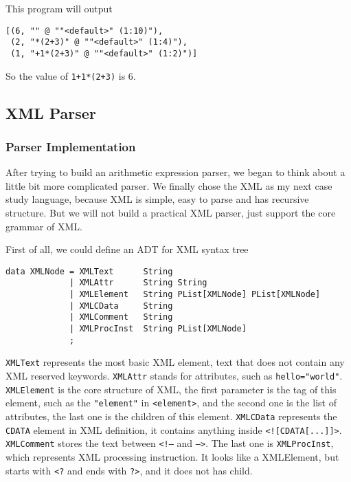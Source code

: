 This program will output

\begin{lstlisting}
[(6, "" @ ""<default>" (1:10)"),
 (2, "*(2+3)" @ ""<default>" (1:4)"),
 (1, "+1*(2+3)" @ ""<default>" (1:2)")]
\end{lstlisting}

So the value of \texttt{1+1*(2+3)} is 6.

\subsection{XML Parser}

\subsubsection{Parser Implementation}

After trying to build an arithmetic expression parser, we began to think about a little bit more complicated parser. We finally chose the XML as my next case study language, because XML is simple, easy to parse and has recursive structure. But we will not build a practical XML parser, just support the core grammar of XML.

First of all, we could define an ADT for XML syntax tree

\begin{lstlisting}
data XMLNode = XMLText      String
             | XMLAttr      String String
             | XMLElement   String PList[XMLNode] PList[XMLNode]
             | XMLCData     String
             | XMLComment   String
             | XMLProcInst  String PList[XMLNode]
             ;
\end{lstlisting}

\texttt{XMLText} represents the most basic XML element, text that does not contain any XML reserved keywords. \texttt{XMLAttr} stands for attributes, such as \texttt{hello="world"}. \texttt{XMLElement} is the core structure of XML, the first parameter is the tag of this element, such as the \texttt{"element"} in \texttt{<element>}, and the second one is the list of attributes, the last one is the children of this element. \texttt{XMLCData} represents the \texttt{CDATA} element in XML definition, it contains anything inside \texttt{<![CDATA[...]]>}. \texttt{XMLComment} stores the text between \texttt{<!--} and \texttt{-->}. The last one is \texttt{XMLProcInst}, which represents XML processing instruction. It looks like a XMLElement, but starts with \texttt{<?} and ends with \texttt{?>}, and it does not has child.

